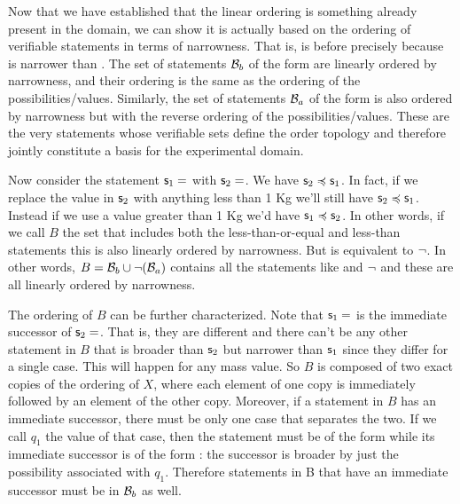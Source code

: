 \documentclass[11pt,letterpaper,fleqn]{memoir} %
\begin{document}
Now that we have established that the linear ordering is something already present in the domain, we can show it is actually based on the ordering of verifiable statements in terms of narrowness. That is,  is before  precisely because  is narrower than . The set of statements $\mathcal{B}_b$ of the form  are linearly ordered by narrowness, and their ordering is the same as the ordering of the possibilities/values. Similarly, the set of statements $\mathcal{B}_a$ of the form  is also ordered by narrowness but with the reverse ordering of the possibilities/values. These are the very statements whose verifiable sets define the order topology and therefore jointly constitute a basis for the experimental domain.

Now consider the statement $\mathsf{s}_1=$ with $\mathsf{s}_2=$. We have $\mathsf{s}_2 \preccurlyeq \mathsf{s}_1$. In fact, if we replace the value in $\mathsf{s}_2$ with anything less than 1 Kg we'll still have $\mathsf{s}_2 \preccurlyeq \mathsf{s}_1$. Instead if we use a value greater than 1 Kg we'd have $\mathsf{s}_1 \preccurlyeq \mathsf{s}_2$. In other words, if we call $B$ the set that includes both the less-than-or-equal and less-than statements this is also linearly ordered by narrowness. But  is equivalent to $\neg$. In other words, $B=\mathcal{B}_b \cup \neg(\mathcal{B}_a)$ contains all the statements like  and $\neg$ and these are all linearly ordered by narrowness.

The ordering of $B$ can be further characterized. Note that $\mathsf{s}_1=$ is the immediate successor of $\mathsf{s}_2=$. That is, they are different and there can't be any other statement in $B$ that is broader than $\mathsf{s}_2$ but narrower than $\mathsf{s}_1$ since they differ for a single case. This will happen for any mass value. So $B$ is composed of two exact copies of the ordering of $X$, where each element of one copy is immediately followed by an element of the other copy. Moreover, if a statement in $B$ has an immediate successor, there must be only one case that separates the two. If we call $q_1$ the value of that case, then the statement must be of the form  while its immediate successor is of the form : the successor is broader by just the possibility associated with $q_1$. Therefore statements in B that have an immediate successor must be in $\mathcal{B}_b$ as well.
\end{document}
